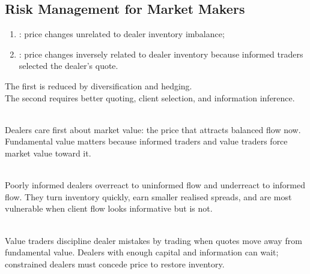 \subsection{Risk Management for Market Makers}

\begin{taxonomy} 
\begin{enumerate}[label=\roman*.]
\setlength{\itemsep}{0pt}
\item {}: price changes unrelated to dealer inventory imbalance;
\item {}: price changes inversely related to dealer inventory because informed traders selected the dealer's quote.
\end{enumerate}
The first is reduced by diversification and hedging.\\
The second requires better quoting, client selection, and information inference.
\end{taxonomy}

\begin{principle} \\
Dealers care first about market value: the price that attracts balanced flow now. Fundamental value matters because informed traders and value traders force market value toward it.
\end{principle}

\begin{caveat} \\
Poorly informed dealers overreact to uninformed flow and underreact to informed flow. They turn inventory quickly, earn smaller realised spreads, and are most vulnerable when client flow looks informative but is not.
\end{caveat}

\begin{mechanism} \\
Value traders discipline dealer mistakes by trading when quotes move away from fundamental value. Dealers with enough capital and information can wait; constrained dealers must concede price to restore inventory.
\end{mechanism}
